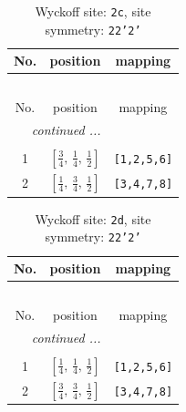 \documentclass[fleqn,8pt]{jsarticle}
\begin{document}
\renewcommand{\arraystretch}{1.2}
\begin{longtable}{ccc}
\caption{Wyckoff site: {\tt 2c}, site symmetry: {\tt 22'2'}}
 \\
 \hline \hline
No. & position & mapping \\ \hline \endfirsthead

\multicolumn{2}{l}{\tablename\ \thetable{}} \\
 \hline \hline
No. & position & mapping \\ \hline \endhead

 \hline \hline
\multicolumn{2}{r}{\footnotesize\it continued ...} \\ \endfoot

 \hline \hline
\multicolumn{2}{r}{} \\ \endlastfoot

1 & $\left[ \frac{3}{4},\, \frac{1}{4},\, \frac{1}{2} \right]$ & {\tt [1,2,5,6]} \\ \hline
2 & $\left[ \frac{1}{4},\, \frac{3}{4},\, \frac{1}{2} \right]$ & {\tt [3,4,7,8]} \\
\end{longtable}
\renewcommand{\arraystretch}{1.2}
\begin{longtable}{ccc}
\caption{Wyckoff site: {\tt 2d}, site symmetry: {\tt 22'2'}}
 \\
 \hline \hline
No. & position & mapping \\ \hline \endfirsthead

\multicolumn{2}{l}{\tablename\ \thetable{}} \\
 \hline \hline
No. & position & mapping \\ \hline \endhead

 \hline \hline
\multicolumn{2}{r}{\footnotesize\it continued ...} \\ \endfoot

 \hline \hline
\multicolumn{2}{r}{} \\ \endlastfoot

1 & $\left[ \frac{1}{4},\, \frac{1}{4},\, \frac{1}{2} \right]$ & {\tt [1,2,5,6]} \\ \hline
2 & $\left[ \frac{3}{4},\, \frac{3}{4},\, \frac{1}{2} \right]$ & {\tt [3,4,7,8]} \\
\end{longtable}
\renewcommand{\arraystretch}{1.2}
\end{document}
